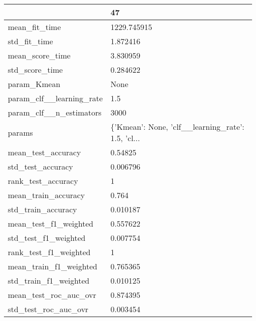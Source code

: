 \begin{tabular}{ll}
\toprule
{} &                                                 47 \\
\midrule
mean\_fit\_time               &                                        1229.745915 \\
std\_fit\_time                &                                           1.872416 \\
mean\_score\_time             &                                           3.830959 \\
std\_score\_time              &                                           0.284622 \\
param\_Kmean                 &                                               None \\
param\_clf\_\_learning\_rate    &                                                1.5 \\
param\_clf\_\_n\_estimators     &                                               3000 \\
params                      &  \{'Kmean': None, 'clf\_\_learning\_rate': 1.5, 'cl... \\
mean\_test\_accuracy          &                                            0.54825 \\
std\_test\_accuracy           &                                           0.006796 \\
rank\_test\_accuracy          &                                                  1 \\
mean\_train\_accuracy         &                                              0.764 \\
std\_train\_accuracy          &                                           0.010187 \\
mean\_test\_f1\_weighted       &                                           0.557622 \\
std\_test\_f1\_weighted        &                                           0.007754 \\
rank\_test\_f1\_weighted       &                                                  1 \\
mean\_train\_f1\_weighted      &                                           0.765365 \\
std\_train\_f1\_weighted       &                                           0.010125 \\
mean\_test\_roc\_auc\_ovr       &                                           0.874395 \\
std\_test\_roc\_auc\_ovr        &                                           0.003454 \\

\end{tabular}
